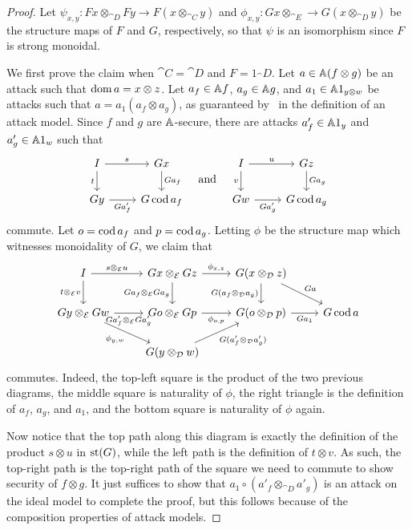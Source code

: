 \begin{proof}
  Let $\psi_{x,y}: Fx\otimes_{\cat{D}} Fy\to F(x\otimes_{\cat{C}} y)$ and
  $\phi_{x,y}: Gx\otimes_{\cat{E}}\to G(x\otimes_{\cat{D}} y)$ be the structure
  maps of $F$ and $G$, respectively, so that $\psi$ is an isomorphism since $F$
  is strong monoidal.

  We first prove the claim when $\cat{C} = \cat{D}$ and $F = 1_\cat{D}$.
  Let $a\in \AA (f\otimes g)$ be an attack such that $\dom a = x\otimes z$.
  Let $a_f\in\AA f$, $a_g\in \AA g$, and $a_1\in \AA 1_{y\otimes w}$ be
  attacks such that $a = a_1(a_f\otimes a_g)$, as guaranteed
  by~ in the definition of an attack model. Since
  $f$ and $g$ are $\AA$-secure, there are attacks $a_f'\in\AA 1_y$ and
  $a_g'\in\AA 1_w$ such that \[
    \begin{tikzcd}
      I\ar[r, "s"]\ar[d, "t"'] & Gx\ar[d, "Ga_f"]\\
      Gy\ar[r, "Ga_f'"'] & G\cod a_f
    \end{tikzcd}
    \quad\text{and}\quad
    \begin{tikzcd}
      I\ar[r, "u"]\ar[d, "v"'] & Gz\ar[d, "Ga_g"]\\
      Gw\ar[r, "Ga_g'"'] & G\cod a_g
    \end{tikzcd}
  \] commute.
  Let $o = \cod a_f$ and $p = \cod a_g$. Letting $\phi$ be the structure
  map which witnesses monoidality of $G$, we claim that \[
    \begin{tikzcd}
      I\ar[r, "s\otimes_{\cat{E}} u"]\ar[d, "t\otimes_{\cat{E}} v"'] &
        Gx\otimes_{\cat{E}} Gz\ar[d, "Ga_f\otimes_{\cat{E}} Ga_g"']\ar[r, "\phi_{x, z}"] &
        G(x\otimes_{\cat{D}} z)\ar[d, "G(a_f\otimes_{\cat{D}} a_g)"']\ar[dr, "Ga"]
      \\
      Gy\otimes_{\cat{E}} Gw\ar[r, "Ga_f'\otimes_{\cat{E}} Ga_g'"']\ar[dr, "\phi_{y, w}"'] &
        Go\otimes_{\cat{E}} Gp\ar[r, "\phi_{o,p}"'] &
        G(o\otimes_{\cat{D}} p)\ar[r, "Ga_1"'] &
        G\cod a
      \\ &
      G(y\otimes_{\cat{D}} w)\ar[ur, "G(a'_f\otimes_{\cat{D}} a'_g)"']
    \end{tikzcd}
  \] commutes. Indeed, the top-left square is the product of the two previous diagrams,
  the middle square is naturality of $\phi$, the right triangle is the definition
  of $a_f$, $a_g$, and $a_1$, and the bottom square is naturality of $\phi$ again.

  Now notice that the top path along this diagram is exactly the definition of
  the product $s\otimes u$ in $\state{G}$, while the left path is the definition
  of $t\otimes v$. As such, the top-right path is the top-right path of the
  square we need to commute to show security of $f\otimes g$. It just suffices
  to show that $a_1\circ (a'_f\otimes_{\cat{D}} a'_g)$ is an attack on the ideal
  model to complete the proof, but this follows because of the composition
  properties of attack models.


\end{proof}
